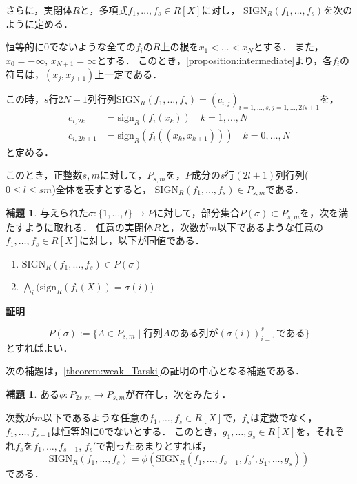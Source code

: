 \documentclass[uplatex, dvipdfmx]{jsarticle}
\makeatletter
\numberwithin{equation}{section}
\renewenvironment{proof}[1][\proofname]{\par
  \pushQED{\qed}%
  \normalfont \topsep6\p@\@plus6\p@\relax
  \trivlist
  \item\relax
  {\bfseries
  #1\@addpunct{.}}\hspace\labelsep\ignorespaces
}{
  \popQED\endtrivlist\@endpefalse
}
\newcommand{\sign}{\mathrm{sign}}
\newcommand{\SIGN}{\mathrm{SIGN}}
\newcommand{\map}[3]{{#1}\colon{#2}\rightarrow{#3}}
\theoremstyle{definition}
\newtheorem{lemma}[definition]{補題}
\renewcommand{\proofname}{\textbf{証明}}
\makeatother
\begin{document}
さらに，実閉体$R$と，多項式$f_1, \dots, f_s \in R[X]$に対し，
$\SIGN_R(f_1, \dots, f_s)$を次のように定める．

恒等的に0でないような全ての$f_i$の$R$上の根を$x_1< \dots< x_N$とする．
また，$x_0 = -\infty$, $x_{N+1} = \infty$とする．
このとき，\cref{proposition:intermediate}より，各$f_i$の符号は，$(x_j, x_{j+1})$上一定である．

この時，$s$行$2N+1$列行列$\SIGN_R(f_1, \dots, f_s) = (c_{i,j})_{i=1, \dots, s, j=1, \dots, 2N+1}$を，
\begin{align}
     c_{i,2k} &= \sign_R(f_i(x_k)) \quad k=1, \dots, N\\
     c_{i,2k+1} &= \sign_R(f_i((x_k, x_{k+1}))) \quad k=0, \dots, N
\end{align}
と定める．

このとき，正整数$s, m$に対して，$P_{s,m}$を，$P$成分の$s$行$(2l+1)$列行列($0 \leq l \leq sm$)全体を表すとすると，
$\SIGN_R(f_1, \dots, f_s) \in P_{s,m}$である．

 

\begin{lemma}\label{lemma:qe_1ststep}
     与えられた$\map{\sigma}{\{1, \dots, t\}}{P}$に対して，部分集合$P(\sigma) \subset P_{s,m}$を，次を満たすように取れる．
     任意の実閉体$R$と，次数が$m$以下であるような任意の$f_1, \dots, f_s \in R[X]$に対し，以下が同値である．
     \begin{enumerate}
          \item $\SIGN_R(f_1, \dots, f_s) \in P(\sigma)$
          \item $\bigwedge_i (\sign_R(f_i(X)) = \sigma(i)$)
     \end{enumerate}
\end{lemma}

\begin{proof}
     \begin{equation}
          P(\sigma):=\{A \in P_{s,m} \mid \text{行列$A$のある列が$(\sigma(i))_{i=1}^s$である}\}
     \end{equation}
     とすればよい．
\end{proof}

次の補題は，\cref{theorem:weak_Tarski}の証明の中心となる補題である．

\begin{lemma}\label{lemma:qe_lowering}
     ある$\map{\phi}{P_{2s,m}}{P_{s,m}}$が存在し，次をみたす．

     次数が$m$以下であるような任意の$f_1, \dots, f_s \in R[X]$で，$f_s$は定数でなく，$f_1, \dots, f_{s-1}$は恒等的に$0$でないとする．
     このとき，$g_1, \dots, g_s \in R[X]$を，それぞれ$f_s$を$f_1, \dots, f_{s-1}$, $f_s'$で割ったあまりとすれば，
     \begin{equation}
          \SIGN_R(f_1, \dots, f_s) = \phi(\SIGN_R(f_1, \dots, f_{s-1}, f_s', g_1, \dots, g_s))
     \end{equation}
     である．
\end{lemma}
\end{document}

